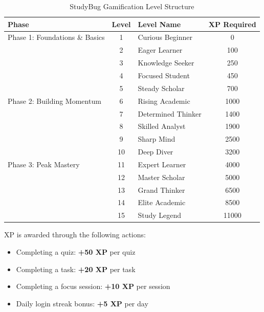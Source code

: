 \begin{table}[htbp]
\centering
\begin{tabular}{|l|c|l|c|}
\hline
\textbf{Phase} & \textbf{Level} & \textbf{Level Name} & \textbf{XP Required} \\
\hline
Phase 1: Foundations \& Basics & 1  & Curious Beginner   & 0 \\
                               & 2  & Eager Learner      & 100 \\
                               & 3  & Knowledge Seeker   & 250 \\
                               & 4  & Focused Student    & 450 \\
                               & 5  & Steady Scholar     & 700 \\
\hline
Phase 2: Building Momentum     & 6  & Rising Academic    & 1000 \\
                               & 7  & Determined Thinker & 1400 \\
                               & 8  & Skilled Analyst    & 1900 \\
                               & 9  & Sharp Mind         & 2500 \\
                               & 10 & Deep Diver         & 3200 \\
\hline
Phase 3: Peak Mastery          & 11 & Expert Learner     & 4000 \\
                               & 12 & Master Scholar     & 5000 \\
                               & 13 & Grand Thinker      & 6500 \\
                               & 14 & Elite Academic     & 8500 \\
                               & 15 & Study Legend       & 11000 \\
\hline
\end{tabular}
\caption{StudyBug Gamification Level Structure}
\end{table}

XP is awarded through the following actions:
\begin{itemize}
    \item Completing a quiz: \textbf{+50 XP} per quiz
    \item Completing a task: \textbf{+20 XP} per task
    \item Completing a focus session: \textbf{+10 XP} per session
    \item Daily login streak bonus: \textbf{+5 XP} per day
\end{itemize}

